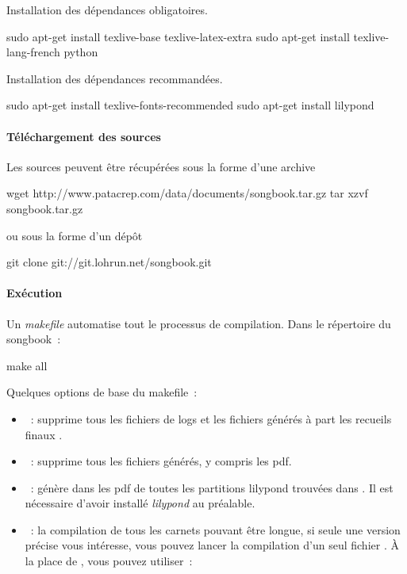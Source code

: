 Installation des dépendances obligatoires.
\begin{unix}
  sudo apt-get install texlive-base texlive-latex-extra
  sudo apt-get install texlive-lang-french python
\end{unix}

Installation des dépendances recommandées.
\begin{unix}
  sudo apt-get install texlive-fonts-recommended
  sudo apt-get install lilypond
\end{unix}

\paragraph{Téléchargement des sources}

Les sources peuvent être récupérées sous la forme d'une archive 
\begin{unix}
  wget http://www.patacrep.com/data/documents/songbook.tar.gz
  tar xzvf songbook.tar.gz
\end{unix}

ou sous la forme d'un dépôt \git

\begin{unix}
  git clone git://git.lohrun.net/songbook.git
\end{unix}

\paragraph{Exécution}

Un \emph{makefile} automatise tout le processus de compilation. 
Dans le répertoire du songbook~:

\begin{unix}
  make all
\end{unix}

Quelques options de base du makefile~:
\begin{itemize}
\item {}~: supprime tous les fichiers de logs et
  les fichiers générés à part les recueils finaux .
\item {}~: supprime tous les fichiers générés,
  y compris les pdf.
\item {}~: génère dans  les
  pdf de toutes les partitions lilypond  trouvées dans
  . Il est nécessaire d'avoir installé
  \emph{lilypond} au préalable.
\item {}~: la compilation de tous les carnets
  pouvant être longue, si seule une version précise vous intéresse,
  vous pouvez lancer la compilation d'un seul fichier . À la place
  de , vous pouvez utiliser~:
\end{itemize}

